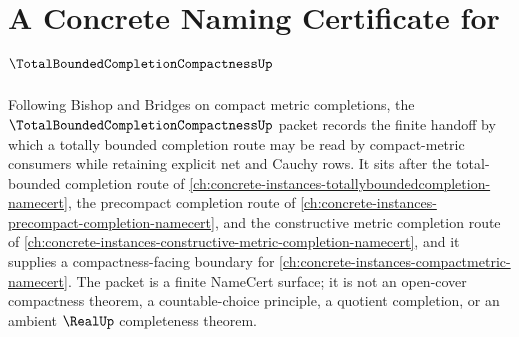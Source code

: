 \chapter{A Concrete Naming Certificate for $\TotalBoundedCompletionCompactnessUp$}
\label{ch:concrete-instances-total-bounded-completion-compactness-namecert}

Following Bishop and Bridges on compact metric completions, the $\TotalBoundedCompletionCompactnessUp$ packet records the finite handoff by which a totally bounded completion route may be read by compact-metric consumers while retaining explicit net and Cauchy rows. It sits after the total-bounded completion route of \autoref{ch:concrete-instances-totallyboundedcompletion-namecert}, the precompact completion route of \autoref{ch:concrete-instances-precompact-completion-namecert}, and the constructive metric completion route of \autoref{ch:concrete-instances-constructive-metric-completion-namecert}, and it supplies a compactness-facing boundary for \autoref{ch:concrete-instances-compactmetric-namecert}. The packet is a finite NameCert surface; it is not an open-cover compactness theorem, a countable-choice principle, a quotient completion, or an ambient $\RealUp$ completeness theorem.


